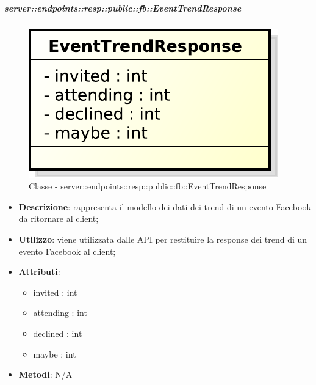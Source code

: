     \subparagraph{server::endpoints::resp::public::fb::EventTrendResponse} %
    \label{subp:bdsm_app_server_endpoints_resp_public_fb_eventtrendresponse}
	\begin{figure}[!htbp]
		\centering
		\centerline{\includegraphics[scale=0.6]{./images/server/classes/endpoints/fb/event_trend_response.pdf}}
		\caption{Classe - server::endpoints::resp::public::fb::EventTrendResponse}
	\end{figure}
    \begin{itemize}
      \item \textbf{Descrizione}: rappresenta il modello dei dati dei trend di un evento Facebook da ritornare al client;
      \item \textbf{Utilizzo}: viene utilizzata dalle API per restituire la response dei trend di un evento Facebook al client;

	  \item \textbf{Attributi}:
	  	\begin{itemize}
	  		\item invited : int
	  		\item attending : int
	  		\item declined : int
	  		\item maybe : int
	  	\end{itemize}
	  \item \textbf{Metodi}: N/A
      \end{itemize}

